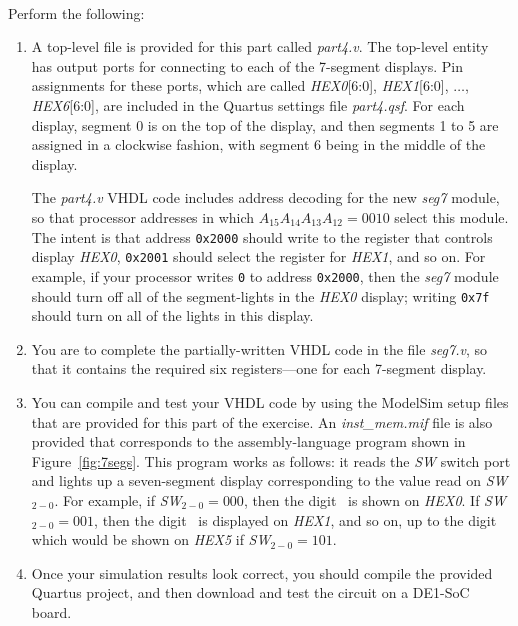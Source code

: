 \documentclass[epsfig,10pt,fullpage]{article}
\begin{document}
~\\
\noindent
Perform the following:

\begin{enumerate}
\item A top-level file is provided for this part
called {\it part4.v}. The top-level entity has output ports for connecting
to each of the 7-segment displays. 
Pin assignments for these ports, which are called {\it HEX0}[6:0], {\it HEX1}[6:0], 
$\ldots$, {\it HEX6}[6:0], are included in the Quartus settings file {\it part4.qsf}. 
For each display, segment 0 is on the top of the display, and then segments 1 to 5 are assigned
in a clockwise fashion, with segment 6 being in the middle of the display.

The {\it part4.v} VHDL code includes address decoding for the new {\it seg7} module, 
so that processor addresses in which $A_{15} A_{14} A_{13} A_{12} = 0010$ select this module.
The intent is that address \texttt{0x2000} should write to the register that controls 
display {\it HEX0}, \texttt{0x2001} should select the register for {\it HEX1}, and 
so on. For example, if your processor 
writes \texttt{0} to address \texttt{0x2000}, then the {\it seg7} module
should turn off all of the segment-lights in the {\it HEX0} display; writing \texttt{0x7f} 
should turn on all of the lights in this display. 

\item 
You are to complete the partially-written VHDL code in the file {\it seg7.v}, so that
it contains the required six registers---one for each 7-segment display. 
        
\item You can compile and test your VHDL code by using the ModelSim setup files that 
are provided for this part of the exercise. An {\it inst\_mem.mif} file is also provided
that corresponds to the assembly-language program shown in 
Figure~\ref{fig:7segs}. This program works as follows: it reads the {\it SW} switch port and 
lights up a seven-segment display corresponding to the value read on {\it SW}$_{2-0}$. For
example, if {\it SW}$_{2-0} = 000$, then the digit~\texttt{} is shown on {\it HEX0}.
If {\it SW}$_{2-0} = 001$, then the digit~\texttt{} is displayed on {\it HEX1}, 
and so on, up to the digit~\texttt{} which would be shown on {\it HEX5} if
{\it SW}$_{2-0} = 101$.

\item Once your simulation results look correct, you should compile the provided Quartus
project, and then download and test the circuit on a DE1-SoC board.
\end{enumerate}
\end{document}
